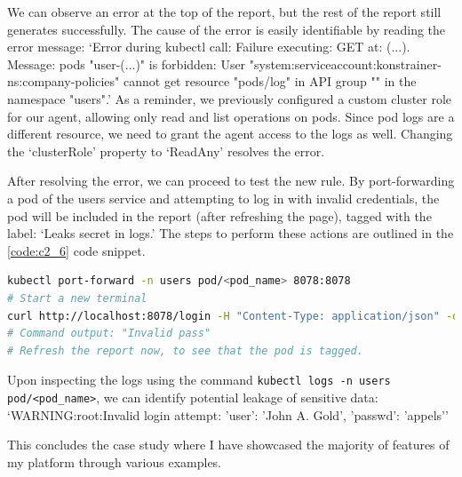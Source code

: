 We can observe an error at the top of the report, but the rest of the report still generates successfully. The cause of the error is easily identifiable by reading the error message: `Error during kubectl call: Failure executing: GET at: (...). Message: pods "user-(...)" is forbidden: User "system:serviceaccount:konstrainer-ns:company-policies" cannot get resource "pods/log" in API group "" in the namespace "users".' As a reminder, we previously configured a custom cluster role for our agent, allowing only read and list operations on pods. Since pod logs are a different resource, we need to grant the agent access to the logs as well. Changing the `clusterRole' property to `ReadAny' resolves the error.

After resolving the error, we can proceed to test the new rule. By port-forwarding a pod of the users service and attempting to log in with invalid credentials, the pod will be included in the report (after refreshing the page), tagged with the label: `Leaks secret in logs.' The steps to perform these actions are outlined in the \ref{code:c2_6} code snippet.

\begin{lstlisting}[caption={Invalid login atempt},language=bash,label=code:c2_6]
kubectl port-forward -n users pod/<pod_name> 8078:8078
# Start a new terminal
curl http://localhost:8078/login -H "Content-Type: application/json" -d '{"user": "John A. Gold", "passwd": "appels"}'
# Command output: "Invalid pass"
# Refresh the report now, to see that the pod is tagged.
\end{lstlisting}

Upon inspecting the logs using the command \lstinline|kubectl logs -n users pod/<pod_name>|, we can identify potential leakage of sensitive data: `WARNING:root:Invalid login attempt: {'user': 'John A. Gold', 'passwd': 'appels'}'

This concludes the case study where I have showcased the majority of features of my platform through various examples.
